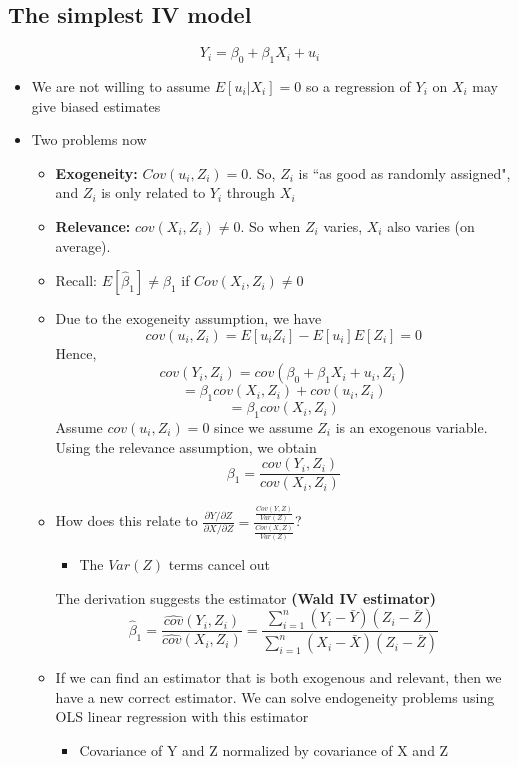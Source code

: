 \documentclass[10pt, oneside]{article}
\begin{document}
\subsection{The simplest IV model}
\[Y_i = \beta_0 + \beta_1 X_i + u_i\]
\begin{itemize}
    \item We are not willing to assume $E[u_i|X_i] = 0$ so a regression of $Y_i$ on $X_i$ may give biased estimates
    \item Two problems now
    \begin{itemize}
        \item \textbf{Exogeneity:} $Cov(u_i, Z_i) = 0$. So, $Z_i$ is ``as good as randomly assigned", and $Z_i$ is only related to $Y_i$ through $X_i$
        \item \textbf{Relevance:} $cov(X_i, Z_i) \neq 0$. So when $Z_i$ varies, $X_i$ also varies (on average).
        \item Recall: $E[\hat \beta_1] \neq \beta_1$ if $Cov(X_i, Z_i) \neq 0$
        \item Due to the exogeneity assumption, we have
        \[cov(u_i,Z_i) = E[u_iZ_i] - E[u_i]E[Z_i] = 0\]
        Hence, 
        \[cov(Y_i, Z_i) = cov(\beta_0 + \beta_1 X_i + u_i, Z_i)\]
        \[=\beta_1 cov(X_i, Z_i) + cov(u_i, Z_i)\]
        \[=\beta_1 cov(X_i, Z_i)\]
        Assume $cov(u_i, Z_i) = 0$ since we assume $Z_i$ is an exogenous variable. Using the relevance assumption, we obtain
        \[\beta_1 = \frac{cov(Y_i, Z_i)}{cov(X_i, Z_i)}\]
        \item How does this relate to $\frac{\partial Y / \partial Z}{\partial X / \partial Z} = \frac{\frac{Cov(Y,Z)}{Var(Z)}}{\frac{Cov(X,Z)}{Var(Z)}}$?
        \begin{itemize}
            \item The $Var(Z)$ terms cancel out
        \end{itemize}
        The derivation suggests the estimator \textbf{(Wald IV estimator)}
        \[\hat \beta_1 = \frac{\widehat{cov}(Y_i, Z_i)}{\widehat{cov} (X_i, Z_i)} = \frac{\sum_{i=1}^n (Y_i - \bar Y)(Z_i - \bar Z)}{\sum_{i=1} ^n (X_i - \bar X)(Z_i - \bar Z)}\]
        \item If we can find an estimator that is both exogenous and relevant, then we have a new correct estimator. We can solve endogeneity problems using OLS linear regression with this estimator
        \begin{itemize}
            \item Covariance of Y and Z normalized by covariance of X and Z

\end{itemize}
\end{itemize}
\end{itemize}
\end{document}
